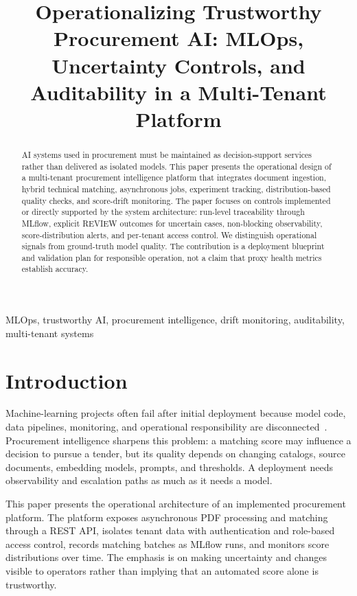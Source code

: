 \documentclass[conference]{IEEEtran}
\title{Operationalizing Trustworthy Procurement AI: MLOps, Uncertainty Controls, and Auditability in a Multi-Tenant Platform}
\author{\IEEEauthorblockN{Anonymous Author}
\IEEEauthorblockA{AI Engineering Practice\\
Replace with author name, affiliation, city, country, and email before submission}}
\begin{document}
\maketitle
\begin{abstract}
AI systems used in procurement must be maintained as decision-support services rather than delivered as isolated models. This paper presents the operational design of a multi-tenant procurement intelligence platform that integrates document ingestion, hybrid technical matching, asynchronous jobs, experiment tracking, distribution-based quality checks, and score-drift monitoring. The paper focuses on controls implemented or directly supported by the system architecture: run-level traceability through MLflow, explicit REVIEW outcomes for uncertain cases, non-blocking observability, score-distribution alerts, and per-tenant access control. We distinguish operational signals from ground-truth model quality. The contribution is a deployment blueprint and validation plan for responsible operation, not a claim that proxy health metrics establish accuracy.
\end{abstract}
\begin{IEEEkeywords}
MLOps, trustworthy AI, procurement intelligence, drift monitoring, auditability, multi-tenant systems
\end{IEEEkeywords}

\section{Introduction}
Machine-learning projects often fail after initial deployment because model code, data pipelines, monitoring, and operational responsibility are disconnected~\cite{sculley2015debt}. Procurement intelligence sharpens this problem: a matching score may influence a decision to pursue a tender, but its quality depends on changing catalogs, source documents, embedding models, prompts, and thresholds. A deployment needs observability and escalation paths as much as it needs a model.

This paper presents the operational architecture of an implemented procurement platform. The platform exposes asynchronous PDF processing and matching through a REST API, isolates tenant data with authentication and role-based access control, records matching batches as MLflow runs, and monitors score distributions over time. The emphasis is on making uncertainty and changes visible to operators rather than implying that an automated score alone is trustworthy.
\end{document}
